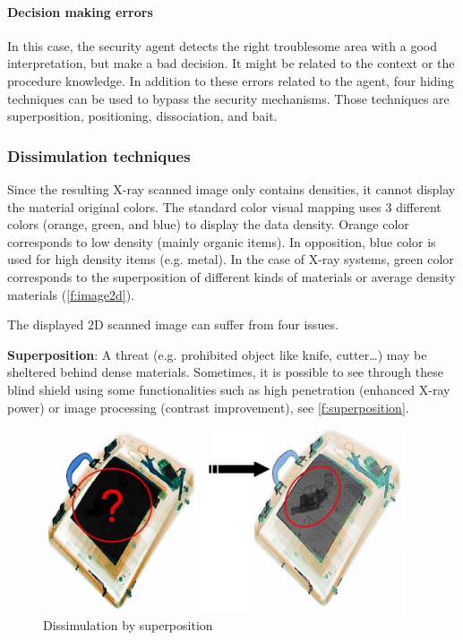 \paragraph{Decision making errors}
In this case, the security agent detects the right troublesome area with a good interpretation, but make a bad decision. It might be related to the context or the procedure knowledge.
In addition to these errors related to the agent, four hiding techniques can be used to bypass the security mechanisms. Those techniques are superposition, positioning, dissociation, and bait.

\subsubsection{ Dissimulation techniques }
Since the resulting X-ray scanned image only contains densities, it cannot display the material original colors. The standard color visual mapping uses 3 different colors (orange, green, and blue) to display the data density. Orange color corresponds to low density (mainly organic items). In opposition, blue color is used for high density items (e.g. metal). In the case of X-ray systems, green color corresponds to the superposition of different kinds of materials or average density materials (\autoref{f:image2d}). 

The displayed 2D scanned image can suffer from four issues.

\textbf{Superposition}: A threat (e.g. prohibited object like knife, cutter…) may be sheltered behind dense materials. Sometimes, it is possible to see through these blind shield using some functionalities such as high penetration (enhanced X-ray power) or image processing (contrast improvement),  see  \autoref{f:superposition}. 
\begin{figure}
\centering
	\includegraphics[width=0.95\textwidth]{Figures/superposition}
	\caption{Dissimulation by superposition}
	\label{f:superposition}
\end{figure}

